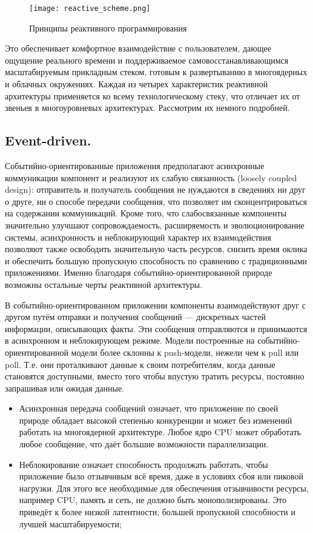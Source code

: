 \begin{figure}[ht]
\centering
  \texttt{[image: reactive\_scheme.png]}
  \caption{ Принципы реактивного программирования }
  \label{fig:reactive_scheme}
\end{figure}

Это обеспечивает комфортное взаимодействие с пользователем, дающее ощущение реального времени и поддерживаемое самовосстанавливающимся масштабируемым прикладным стеком, готовым к развертыванию в многоядерных и облачных окружениях. Каждая из четырех характеристик реактивной архитектуры применяется ко всему технологическому стеку, что отличает их от звеньев в многоуровневых архитектурах. Рассмотрим их немного подробней.

\subsection{Event-driven. }
\label{subsub:domain:reactive_programming:event_driven}

Событийно-ориентированные приложения предполагают асинхронные коммуникации компонент и реализуют их слабую связанность (loosely coupled design): отправитель и получатель сообщения не нуждаются в сведениях ни друг о друге, ни о способе передачи сообщения, что позволяет им сконцентрироваться на содержании коммуникаций. Кроме того, что слабосвязанные компоненты значительно улучшают сопровождаемость, расширяемость и эволюционирование системы, асинхронность и неблокирующий характер их взаимодействия позволяют также освободить значительную часть ресурсов, снизить время оклика и обеспечить большую пропускную способность по сравнению с традиционными приложениями. Именно благодаря событийно-ориентированной природе возможны остальные черты реактивной архитектуры.

В событийно-ориентированном приложении компоненты взаимодействуют друг с другом путём отправки и получения сообщений --- дискретных частей информации, описывающих факты. Эти сообщения отправляются и принимаются в асинхронном и неблокирующем режиме. Модели построенные на событийно-ориентированной модели более склонны к push-модели, нежели чем к pull или poll. Т.е. они проталкивают данные к своим потребителям, когда данные становятся доступными, вместо того чтобы впустую тратить ресурсы, постоянно запрашивая или ожидая данные.

\begin{itemize}
  \item Асинхронная передача сообщений означает, что приложение по своей природе обладает высокой степенью конкуренции и может без изменений работать на многоядерной архитектуре. Любое ядро CPU может обработать любое сообщение, что даёт большие возможности параллелизации.
  \item Неблокирование означает способность продолжать работать, чтобы приложение было отзывчивым всё время, даже в условиях сбоя или пиковой нагрузки. Для этого все необходимые для обеспечения отзывчивости ресурсы, например CPU, память и сеть, не должно быть монополизированы. Это приведёт к более низкой латентности, большей пропускной способности и лучшей масштабируемости;
\end{itemize}

